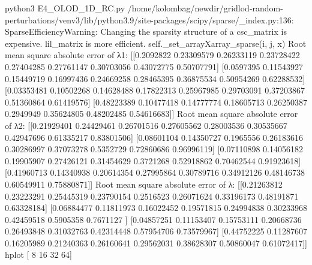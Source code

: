 python3 E4_OLOD_1D_RC.py
/home/kolombag/newdir/gridlod-random-perturbations/venv3/lib/python3.9/site-packages/scipy/sparse/_index.py:136: SparseEfficiencyWarning: Changing the sparsity structure of a csc_matrix is expensive. lil_matrix is more efficient.
  self._set_arrayXarray_sparse(i, j, x)
Root mean square absolute error of λ1:
 [[0.2092822  0.23309579 0.26233119 0.23728422 0.27404285 0.27761147
  0.30703056 0.43072775 0.50707791]
 [0.0597395  0.11543927 0.15449719 0.16997436 0.24669258 0.28465395
  0.36875534 0.50954269 0.62288532]
 [0.03353481 0.10502268 0.14628488 0.17822313 0.25967985 0.29703091
  0.37203867 0.51360864 0.61419576]
 [0.48223389 0.10477418 0.14777774 0.18605713 0.26250387 0.2949949
  0.35624805 0.48202485 0.54616683]]
Root mean square absolute error of λ2: 
 [[0.21929401 0.24429461 0.26701516 0.27605562 0.28003536 0.30535667
  0.42947696 0.61335217 0.83801506]
 [0.08601104 0.14350727 0.1965556  0.26183616 0.30286997 0.37073278
  0.5352729  0.72860686 0.96996119]
 [0.07110898 0.14056182 0.19905907 0.27426121 0.31454629 0.3721268
  0.52918862 0.70462544 0.91923618]
 [0.41960713 0.14340938 0.20614354 0.27995864 0.30789716 0.34912126
  0.48146738 0.60549911 0.75880871]]
Root mean square absolute error of λ: 
 [[0.21263812 0.23223291 0.25445319 0.23790154 0.2516523  0.26071624
  0.33196173 0.48191871 0.63328184]
 [0.06884477 0.11811973 0.16022452 0.19571815 0.24994838 0.30233968
  0.42459518 0.5905358  0.7671127 ]
 [0.04857251 0.11153407 0.15753111 0.20668736 0.26493848 0.31032763
  0.42314448 0.57954706 0.73579967]
 [0.44752225 0.11287607 0.16205989 0.21240363 0.26160641 0.29562031
  0.38628307 0.50860047 0.61072417]]
hplot [ 8 16 32 64]